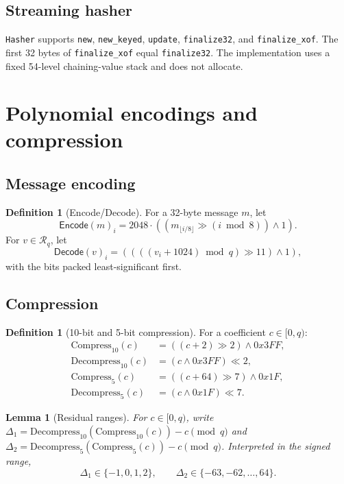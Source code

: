 \documentclass[11pt,a4paper]{article}
\theoremstyle{plain}
\newtheorem{lemma}[theorem]{Lemma}
\theoremstyle{definition}
\newtheorem{definition}[theorem]{Definition}
\theoremstyle{remark}
\newcommand{\Ring}{\mathcal{R}_q}
\newcommand{\Encode}{\mathsf{Encode}}
\newcommand{\Decode}{\mathsf{Decode}}
\newcommand{\Compress}{\mathrm{Compress}}
\newcommand{\Decompress}{\mathrm{Decompress}}
\begin{document}
\subsection{Streaming hasher}

\texttt{Hasher} supports \texttt{new}, \texttt{new\_keyed},
\texttt{update}, \texttt{finalize32}, and \texttt{finalize\_xof}.  The
first 32 bytes of \texttt{finalize\_xof} equal \texttt{finalize32}.
The implementation uses a fixed 54-level chaining-value stack and does
not allocate.

\section{Polynomial encodings and compression}
\label{sec:poly}

\subsection{Message encoding}

\begin{definition}[Encode/Decode]
For a 32-byte message $m$, let
\[
 \Encode(m)_i=2048\cdot((m_{\lfloor i/8\rfloor}\gg(i\bmod 8))\land1).
\]
For $v\in\Ring$, let
\[
 \Decode(v)_i=
 \left(\left(\left((v_i+1024)\bmod q\right)\gg11\right)\land1\right),
\]
with the bits packed least-significant first.
\end{definition}

\subsection{Compression}

\begin{definition}[10-bit and 5-bit compression]
For a coefficient $c\in[0,q)$:
\[
 \begin{aligned}
 \Compress_{10}(c)&=((c+2)\gg2)\land0x3FF,\\
 \Decompress_{10}(c)&=(c\land0x3FF)\ll2,\\
 \Compress_5(c)&=((c+64)\gg7)\land0x1F,\\
 \Decompress_5(c)&=(c\land0x1F)\ll7.
 \end{aligned}
\]
\end{definition}

\begin{lemma}[Residual ranges]
\label{lem:residual}
For $c\in[0,q)$, write
$\Delta_1=\Decompress_{10}(\Compress_{10}(c))-c\pmod q$ and
$\Delta_2=\Decompress_5(\Compress_5(c))-c\pmod q$.  Interpreted in the
signed range,
\[
 \Delta_1\in\{-1,0,1,2\},\qquad
 \Delta_2\in\{-63,-62,\ldots,64\}.
\]
\end{lemma}
\end{document}
